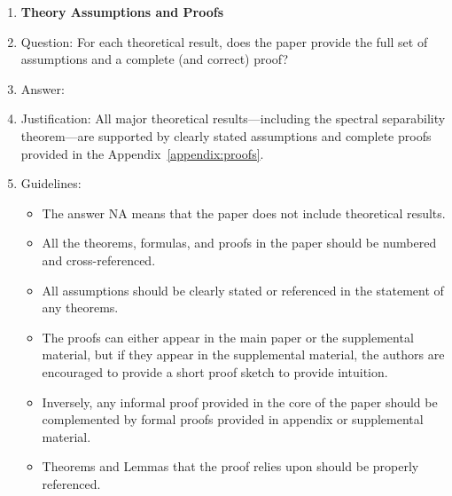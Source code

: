 \documentclass{article}
\begin{document}
\begin{enumerate}
\item {\bf Theory Assumptions and Proofs}
    \item[] Question: For each theoretical result, does the paper provide the full set of assumptions and a complete (and correct) proof?
    \item[] Answer: \answerYes{}
    \item[] Justification: All major theoretical results—including the spectral separability theorem—are supported by clearly stated assumptions and complete proofs provided in the Appendix~\ref{appendix:proofs}.
    \item[] Guidelines:
    \begin{itemize}
        \item The answer NA means that the paper does not include theoretical results. 
        \item All the theorems, formulas, and proofs in the paper should be numbered and cross-referenced.
        \item All assumptions should be clearly stated or referenced in the statement of any theorems.
        \item The proofs can either appear in the main paper or the supplemental material, but if they appear in the supplemental material, the authors are encouraged to provide a short proof sketch to provide intuition. 
        \item Inversely, any informal proof provided in the core of the paper should be complemented by formal proofs provided in appendix or supplemental material.
        \item Theorems and Lemmas that the proof relies upon should be properly referenced. 
    \end{itemize}


\end{enumerate}
\end{document}
